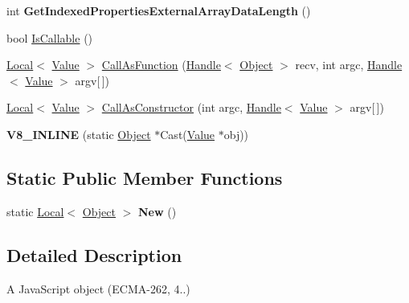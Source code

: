 \begin{DoxyCompactItemize}
\item 
\hypertarget{classv8_1_1_object_a9aa725628f4d3371999663e6611efeb3}{}int {\bfseries Get\+Indexed\+Properties\+External\+Array\+Data\+Length} ()\label{classv8_1_1_object_a9aa725628f4d3371999663e6611efeb3}

\item 
bool \hyperlink{classv8_1_1_object_a23c2c1f23b50fab4a02e2f819641b865}{Is\+Callable} ()
\item 
\hyperlink{classv8_1_1_local}{Local}$<$ \hyperlink{classv8_1_1_value}{Value} $>$ \hyperlink{classv8_1_1_object_a96ab0606a2c771ec6e2e5696749e7885}{Call\+As\+Function} (\hyperlink{classv8_1_1_handle}{Handle}$<$ \hyperlink{classv8_1_1_object}{Object} $>$ recv, int argc, \hyperlink{classv8_1_1_handle}{Handle}$<$ \hyperlink{classv8_1_1_value}{Value} $>$ argv\mbox{[}$\,$\mbox{]})
\item 
\hyperlink{classv8_1_1_local}{Local}$<$ \hyperlink{classv8_1_1_value}{Value} $>$ \hyperlink{classv8_1_1_object_afeb999e9225dad0ca8605ed3015b268b}{Call\+As\+Constructor} (int argc, \hyperlink{classv8_1_1_handle}{Handle}$<$ \hyperlink{classv8_1_1_value}{Value} $>$ argv\mbox{[}$\,$\mbox{]})
\item 
\hypertarget{classv8_1_1_object_aef3c37836376e1069d8c1b91caa5c20d}{}{\bfseries V8\+\_\+\+I\+N\+L\+I\+N\+E} (static \hyperlink{classv8_1_1_object}{Object} $\ast$Cast(\hyperlink{classv8_1_1_value}{Value} $\ast$obj))\label{classv8_1_1_object_aef3c37836376e1069d8c1b91caa5c20d}

\end{DoxyCompactItemize}
\subsection*{Static Public Member Functions}
\begin{DoxyCompactItemize}
\item 
\hypertarget{classv8_1_1_object_a4360445f2166250431502b82242ba873}{}static \hyperlink{classv8_1_1_local}{Local}$<$ \hyperlink{classv8_1_1_object}{Object} $>$ {\bfseries New} ()\label{classv8_1_1_object_a4360445f2166250431502b82242ba873}

\end{DoxyCompactItemize}


\subsection{Detailed Description}
A Java\+Script object (E\+C\+M\+A-\/262, 4..) 


